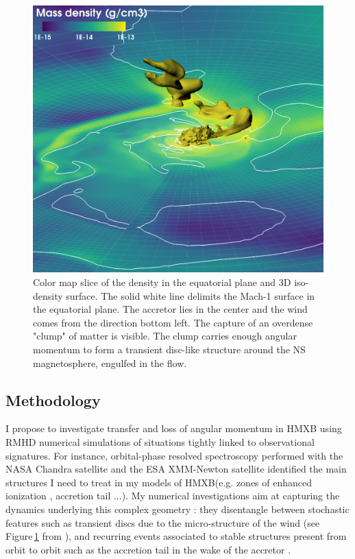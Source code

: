 \documentclass[letterpaper,12pt,onecolumn]{article}
\makeatletter
\newcommand*{\hmxb}{HMXB\@\xspace}
\newcommand*{\ns}{NS\@\xspace}
\newcommand*{\eg}{e.g.\@\xspace}
\makeatother
\begin{document}
\begin{figure}[!b]
\centering
\includegraphics[width=0.65\columnwidth]{Figures/clump_intruder.jpeg}
\caption{Color map slice of the density in the equatorial plane and 3D iso-density surface. The solid white line delimits the Mach-1 surface in the equatorial plane. The accretor lies in the center and the wind comes from the direction bottom left. The capture of an overdense "clump" of matter is visible. The clump carries enough angular momentum to form a transient disc-like structure around the \ns magnetosphere, engulfed in the flow.}
\label{fig:disc}
\end{figure} 

\subsection*{Methodology}

I propose to investigate transfer and loss of angular momentum in \hmxb using RMHD numerical simulations of situations tightly linked to observational signatures. For instance, orbital-phase resolved spectroscopy performed with the NASA Chandra satellite and the ESA XMM-Newton satellite identified the main structures I need to treat in my models of \hmxb (\eg zones of enhanced ionization \citep{Grinberg2017}, accretion tail \citep{Martinez-Nunez2014}...). My numerical investigations aim at capturing the dynamics underlying this complex geometry : they disentangle between stochastic features such as transient discs due to the micro-structure of the wind (see Figure\,\ref{fig:disc} from \cite{ElMellah}), and recurring events associated to stable structures present from orbit to orbit such as the accretion tail in the wake of the accretor \citep{ElMellah2015}.
\end{document}
